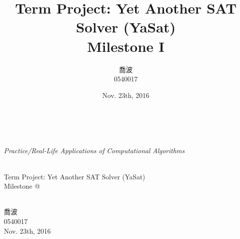 \documentclass[a4paper, 11.5pt]{article}
\title{Term Project: Yet Another SAT Solver (YaSat) \\ Milestone I}
\author{喬波\\0540017\\}
\date{Nov. 23th, 2016}
\makeatletter
\newcommand*{\rom}[1]{\expandafter\@slowromancap\romannumeral #1@}
\makeatother
\begin{document}

  \begin{flushleft}
    \ \\ \ \\
    \large{\em Practice/Real-Life Applications of Computational Algorithms} \\ \ 
  \end{flushleft}

  \begin{center}
    \huge{Term Project: Yet Another SAT Solver (YaSat) }\\
    \LARGE{Milestone \rom{1}}
  \end{center}
  \begin{center}
    \ \\
    喬波\\
    0540017\\
    Nov. 23th, 2016\\ \ \\ \ \\
  \end{center}
\end{document}
